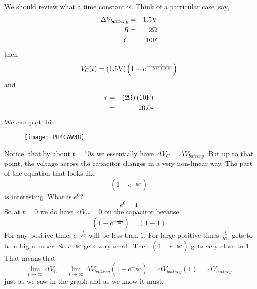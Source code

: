 We should review what a time constant is. Think of a particular case, say, 
\begin{eqnarray*}
\Delta V_{battery} &=&1.5\unit{V} \\
R &=&2\unit{%
\Omega%
} \\
C &=&10\unit{F}
\end{eqnarray*}%
then%
\begin{equation*}
V_{C}(t)=\left( 1.5\unit{V}\right) \left( 1-e^{-\frac{t}{\left( 2\unit{%
\Omega%
}\right) \left( 10\unit{F}\right) }}\right)
\end{equation*}%
and 
\begin{eqnarray*}
\tau &=&\left( 2\unit{%
\Omega%
}\right) \left( 10\unit{F}\right) \\
&=&\allowbreak 20.0\unit{s}
\end{eqnarray*}%
We can plot this\begin{figure}[h!]
\texttt{[image: PH4CAW38]}
\end{figure}Notice, that by about $t=70\unit{s%
}$ we essentially have $\Delta V_{C}=\Delta V_{battery}.$ But up to that
point, the voltage across the capacitor changes in a very non-linear way.
The part of the equation that looks like%
\begin{equation*}
\left( 1-e^{-\frac{t}{RC}}\right)
\end{equation*}%
is interesting. What is $e^{0}$?%
\begin{equation*}
e^{0}=1
\end{equation*}%
So at $t=0$ we do have $\Delta V_{C}=0$ on the capacitor because 
\begin{equation*}
\left( 1-e^{-\frac{t}{RC}}\right) =\left( 1-1\right)
\end{equation*}%
For any positive time, $e^{-\frac{t}{RC}}$ will be less than $1.$ For large
positive times $\frac{t}{RC}$ gets to be a big number. So $e^{-\frac{t}{RC}}$
gets very small. Then $\left( 1-e^{-\frac{t}{RC}}\right) $ gets very close
to $1.$ That means that 
\begin{equation*}
\underset{t\rightarrow \infty }{\lim }\Delta V_{C}=\underset{t\rightarrow
\infty }{\lim }\Delta V_{battery}\left( 1-e^{-\frac{t}{RC}}\right) =\Delta
V_{battery}\left( 1\right) =\Delta V_{battery}
\end{equation*}%
just as we saw in the graph and as we know it must.

